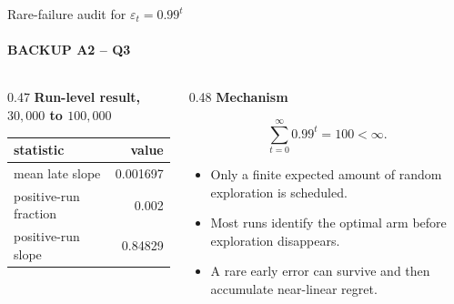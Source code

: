 \begin{frame}{Rare-failure audit for $\varepsilon_t=0.99^t$}
  \framesubtitle{BACKUP A2 -- Q3}
  \vspace{0.12cm}
  \begin{columns}[T,onlytextwidth]
    \begin{column}{0.47\textwidth}
      \textbf{Run-level result, \(30{,}000\) to \(100{,}000\)}\par
      \vspace{0.18cm}
      \hfill
      \vspace{0.30cm}
      \begin{tabular}{@{}lr@{}}
        \toprule
        statistic & value\\
        \midrule
        mean late slope & 0.001697\\
        positive-run fraction & 0.002\\
        positive-run slope & 0.84829\\
        \bottomrule
      \end{tabular}
    \end{column}
    \begin{column}{0.48\textwidth}
      \textbf{Mechanism}\par
      \[
        \sum_{t=0}^{\infty}0.99^t = 100 < \infty.
      \]
      \begin{itemize}
        \item Only a finite expected amount of random exploration is scheduled.
        \item Most runs identify the optimal arm before exploration disappears.
        \item A rare early error can survive and then accumulate near-linear regret.
      \end{itemize}
    \end{column}
  \end{columns}
\end{frame}
